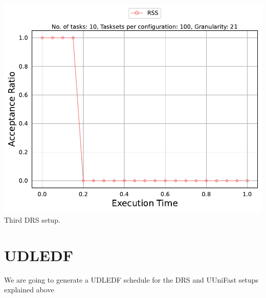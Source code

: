\documentclass[]{article}
\begin{document}
\begin{minipage}[t]{0.48\linewidth}
		\includegraphics[width=\linewidth]{RSS_3rdSetup_DRS.pdf}
		Third DRS setup.
		\vspace{0.3cm}
	\end{minipage}

	\clearpage
	\section{UDLEDF}
{
\raggedleft We are going to generate a UDLEDF schedule for the DRS and UUniFast setups explained above \newline
}
\end{document}
